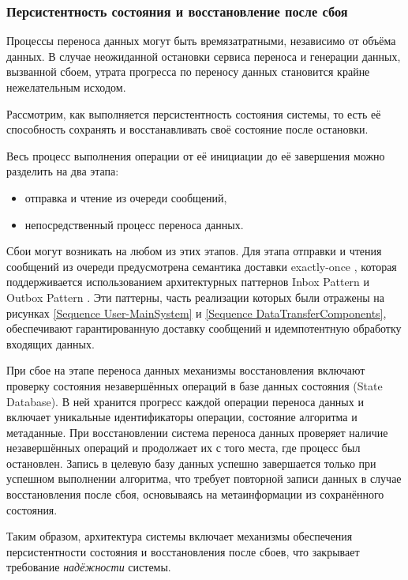\subsubsection{Персистентность состояния и восстановление после сбоя}

Процессы переноса данных могут быть времязатратными, независимо от объёма данных. В случае неожиданной остановки сервиса переноса и генерации данных, вызванной сбоем, утрата прогресса по переносу данных становится крайне нежелательным исходом.

Рассмотрим, как выполняется персистентность состояния системы, то есть её способность сохранять и восстанавливать своё состояние после остановки.

Весь процесс выполнения операции от её инициации до её завершения можно разделить на два этапа:
\begin{itemize}
  \item отправка и чтение из очереди сообщений,
  \item непосредственный процесс переноса данных.
\end{itemize}

Сбои могут возникать на любом из этих этапов. Для этапа отправки и чтения сообщений из очереди предусмотрена семантика доставки exactly-once \cite{delivery-guarantees}, которая поддерживается использованием архитектурных паттернов Inbox Pattern и Outbox Pattern \cite{outbox-and-inbox}. Эти паттерны, часть реализации которых были отражены на рисунках \ref{Sequence User-MainSystem} и \ref{Sequence DataTransferComponents}, обеспечивают гарантированную доставку сообщений и идемпотентную обработку входящих данных.

При сбое на этапе переноса данных механизмы восстановления включают проверку состояния незавершённых операций в базе данных состояния (State Database). В ней хранится прогресс каждой операции переноса данных и включает уникальные идентификаторы операции, состояние алгоритма и метаданные. При восстановлении система переноса данных проверяет наличие незавершённых операций и продолжает их с того места, где процесс был остановлен. Запись в целевую базу данных успешно завершается только при успешном выполнении алгоритма, что требует повторной записи данных в случае восстановления после сбоя, основываясь на метаинформации из сохранённого состояния.

Таким образом, архитектура системы включает механизмы обеспечения персистентности состояния и восстановления после сбоев, что закрывает требование \textit{надёжности} системы.


